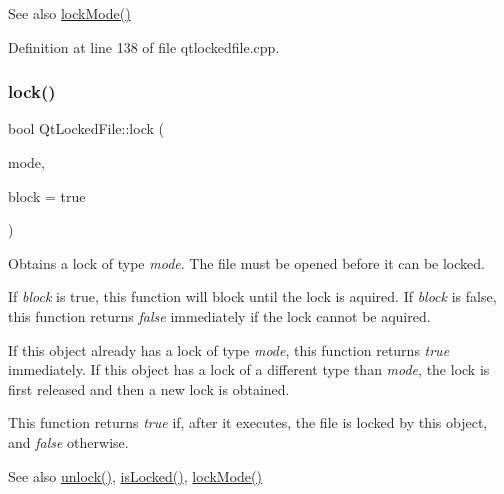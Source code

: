\begin{DoxySeeAlso}{See also}
\hyperlink{class_qt_l_p___private_1_1_qt_locked_file_a0ae096d85cb722b1563521ad2b6dbde2}{lock\+Mode()} 
\end{DoxySeeAlso}


Definition at line 138 of file qtlockedfile.\+cpp.

\mbox{\label{class_qt_l_p___private_1_1_qt_locked_file_af7876c08254a16d00022939f2fb9a8b8}} 
\subsubsection{\texorpdfstring{lock()}{lock()}}
{\footnotesize\ttfamily bool Qt\+Locked\+File\+::lock (\begin{DoxyParamCaption}\item[{\hyperlink{class_qt_l_p___private_1_1_qt_locked_file_ab9a54228983e33cf1fb8dace52141f26}{Lock\+Mode}}]{mode,  }\item[{bool}]{block = {\ttfamily true} }\end{DoxyParamCaption})}

Obtains a lock of type {\itshape mode}. The file must be opened before it can be locked.

If {\itshape block} is true, this function will block until the lock is aquired. If {\itshape block} is false, this function returns {\itshape false} immediately if the lock cannot be aquired.

If this object already has a lock of type {\itshape mode}, this function returns {\itshape true} immediately. If this object has a lock of a different type than {\itshape mode}, the lock is first released and then a new lock is obtained.

This function returns {\itshape true} if, after it executes, the file is locked by this object, and {\itshape false} otherwise.

\begin{DoxySeeAlso}{See also}
\hyperlink{class_qt_l_p___private_1_1_qt_locked_file_abb4d7e6211d9e6e14afaa661818fb2bf}{unlock()}, \hyperlink{class_qt_l_p___private_1_1_qt_locked_file_a0800b8ae9f4d268fe6968b9075f64bb3}{is\+Locked()}, \hyperlink{class_qt_l_p___private_1_1_qt_locked_file_a0ae096d85cb722b1563521ad2b6dbde2}{lock\+Mode()} 
\end{DoxySeeAlso}


